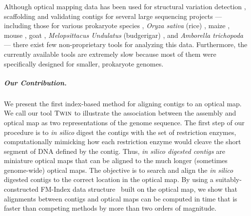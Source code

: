 Although optical mapping data has been used for structural variation detection \cite{teague}, scaffolding and validating contigs for several large sequencing projects --- including those for various prokaryote species \cite{reslewic,zhou,zhou2}, \emph{Oryza sativa} (rice) \cite{rice2}, maize \cite{Zhou09}, mouse \cite{church}, goat \cite{GOAT}, \emph{Melopsittacus Undulatus} (budgerigar) \cite{gigadb}, and \emph{Amborella trichopoda} \cite{amborella} --- there exist few non-proprietary tools for analyzing this data. Furthermore, the currently available tools are extremely slow because most of them were specifically designed for smaller, prokaryote genomes.



\subparagraph{Our Contribution.}
We present the first index-based method for aligning contigs to an optical map.
We call our tool $\mbox{\rm \textsc{Twin}}$ to illustrate the association between the assembly and optical map as two representations of the genome sequence.  The first step of our procedure is to \emph{in silico} digest the contigs with the set of restriction enzymes, computationally mimicking how each restriction enzyme would cleave the short segment of DNA defined by the contig.  Thus, \emph{in silico digested contigs} are miniature optical maps that can be aligned to the much longer (sometimes genome-wide) optical maps.  The objective is to search and align the \emph{in silico} digested contigs to the correct location in the optical map.
By using a suitably-constructed FM-Index data structure~\cite{fm2005} built on the optical map,  we show that alignments between contigs and optical maps can be computed in time that is faster
than competing methods by more than two orders of magnitude.



